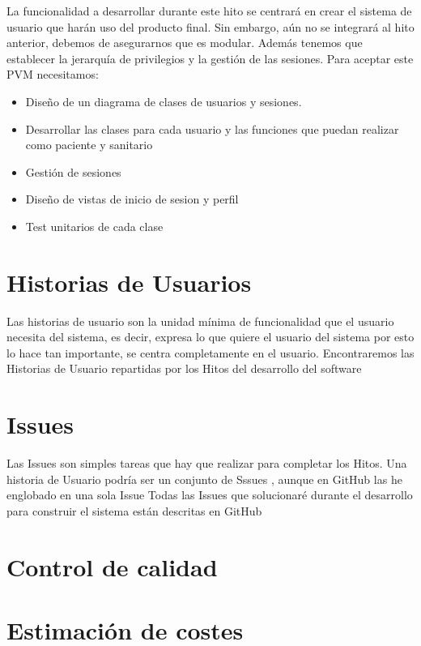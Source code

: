 La funcionalidad a desarrollar durante este hito se centrará en crear el sistema de usuario que harán uso del producto final.
Sin embargo, aún no se integrará al hito anterior, debemos de asegurarnos que es modular. Además tenemos que establecer la 
jerarquía de privilegios y la gestión de las sesiones. 
Para aceptar este PVM necesitamos: 

\begin{itemize}
    \item{Diseño de un diagrama de clases de usuarios y sesiones.}
    \item{Desarrollar las clases para cada usuario y las funciones que puedan realizar como paciente y sanitario}
    \item{Gestión de sesiones}
    \item{Diseño de vistas de inicio de sesion y perfil}
    \item{Test unitarios de cada clase}    
\end{itemize}


\section{Historias de Usuarios}
Las historias de usuario son la unidad mínima de funcionalidad que el usuario necesita del sistema, es decir, 
expresa lo que quiere el usuario del sistema por esto lo hace tan importante, se centra completamente en el 
usuario. Encontraremos las Historias de Usuario repartidas por los Hitos del desarrollo del software 

\section{Issues}
Las Issues son simples tareas que hay que realizar para completar los Hitos. 
Una historia de Usuario podría ser un conjunto de Sssues , aunque en GitHub las he englobado en una sola Issue
Todas las Issues que solucionaré durante el desarrollo para construir el sistema están descritas en GitHub 


\section{Control de calidad}



\section{Estimación de costes}
